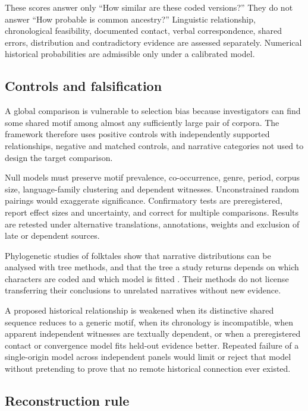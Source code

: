 \documentclass[11pt]{article}
\DeclareRobustCommand{\_}{\textunderscore\allowbreak}
\begin{document}
These scores answer only ``How similar are these coded versions?'' They do not
answer ``How probable is common ancestry?'' Linguistic relationship,
chronological feasibility, documented contact, verbal correspondence, shared
errors, distribution and contradictory evidence are assessed separately.
Numerical historical probabilities are admissible only under a calibrated model.

\subsection{Controls and falsification}

A global comparison is vulnerable to selection bias because investigators can
find some shared motif among almost any sufficiently large pair of corpora. The
framework therefore uses positive controls with independently supported
relationships, negative and matched controls, and narrative categories not used
to design the target comparison.

Null models must preserve motif prevalence, co-occurrence, genre, period, corpus
size, language-family clustering and dependent witnesses. Unconstrained random
pairings would exaggerate significance. Confirmatory tests are preregistered,
report effect sizes and uncertainty, and correct for multiple comparisons.
Results are retested under alternative translations, annotations, weights and
exclusion of late or dependent sources.

Phylogenetic studies of folktales show that narrative distributions can be analysed
with tree methods, and that the tree a study returns depends on which characters are
coded and which model is fitted \citep{tehrani2013,dasilva2016}. Their methods do not
license transferring their conclusions to unrelated narratives without new evidence.

A proposed historical relationship is weakened when its distinctive shared
sequence reduces to a generic motif, when its chronology is incompatible, when
apparent independent witnesses are textually dependent, or when a preregistered
contact or convergence model fits held-out evidence better. Repeated failure of
a single-origin model across independent panels would limit or reject that model
without pretending to prove that no remote historical connection ever existed.

\subsection{Reconstruction rule}
\end{document}
